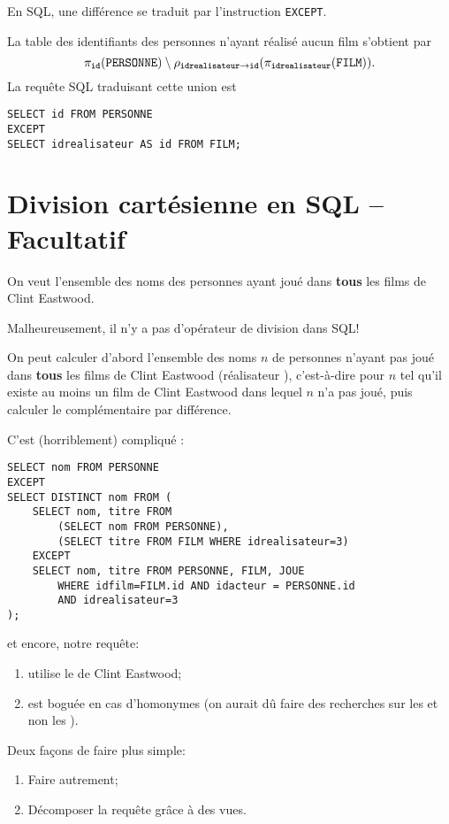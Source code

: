 En SQL, une différence se traduit par l'instruction \texttt{EXCEPT}.
\begin{exemple}
La table des identifiants des personnes n'ayant réalisé aucun film s'obtient par 
\begin{equation*}
  \pi_{\mathtt{id}}(\mathtt{PERSONNE})\setminus \rho_{\mathtt{idrealisateur}\rightarrow\mathtt{id}}(\pi_{\mathtt{idrealisateur}}(\mathtt{FILM})).
\end{equation*}
La requête SQL traduisant cette union est 
\begin{verbatim}
SELECT id FROM PERSONNE
EXCEPT
SELECT idrealisateur AS id FROM FILM;
\end{verbatim}
\end{exemple}

\section{Division cartésienne en SQL -- Facultatif}
\footnotesize
On veut l'ensemble des  noms des personnes ayant
joué dans \textbf{tous} les films de Clint Eastwood.

Malheureusement, il n'y a pas d'opérateur de division dans SQL!

On peut calculer d'abord l'ensemble des noms $n$ de personnes n'ayant pas joué dans \textbf{tous} les
films de Clint Eastwood (réalisateur ), c'est-à-dire pour $n$ tel
qu'il existe
au moins un film de Clint Eastwood dans lequel $n$ n'a pas joué, puis
calculer le complémentaire par différence.

C'est (horriblement) compliqué :
\begin{Verbatim}
SELECT nom FROM PERSONNE
EXCEPT
SELECT DISTINCT nom FROM (
    SELECT nom, titre FROM
        (SELECT nom FROM PERSONNE),
        (SELECT titre FROM FILM WHERE idrealisateur=3)
    EXCEPT
    SELECT nom, titre FROM PERSONNE, FILM, JOUE
        WHERE idfilm=FILM.id AND idacteur = PERSONNE.id
        AND idrealisateur=3
);
\end{Verbatim}

et encore, notre requête:
\begin{enumerate}
\item utilise le \ttid{} de Clint Eastwood;
\item est boguée en cas d'homonymes (on aurait dû faire des recherches
  sur les \ttid{} et non les \ttnom{}).
\end{enumerate}

Deux façons de faire plus simple:
\begin{enumerate}
\item Faire autrement;
\item Décomposer la requête grâce à des vues.
\end{enumerate}

